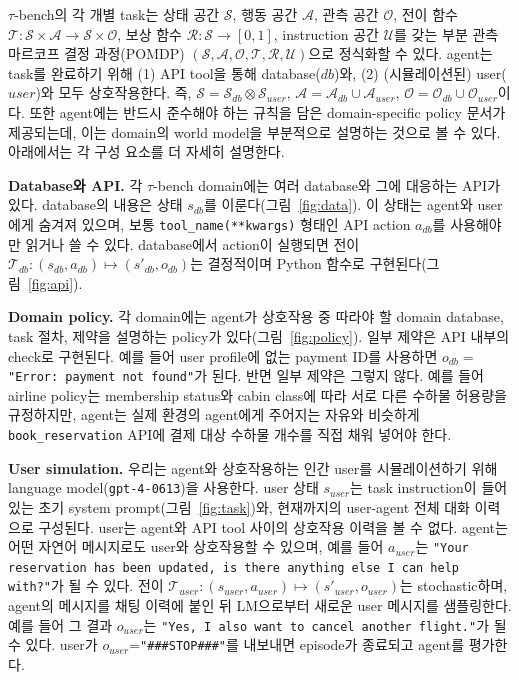 \documentclass{article}
\newcommand{\benchmark}{$\tau$-bench}
\begin{document}
 \benchmark{}의 각 개별 task는 상태 공간 $\mathcal{S}$, 행동 공간 $\mathcal{A}$, 관측 공간 $\mathcal{O}$, 전이 함수 $\mathcal{T}: \mathcal{S} \times \mathcal{A} \to \mathcal{S} \times \mathcal{O}$, 보상 함수 $\mathcal{R}: \mathcal{S} \to [0, 1]$, instruction 공간 $\mathcal{U}$를 갖는 부분 관측 마르코프 결정 과정(POMDP) $(\mathcal{S}, \mathcal{A}, \mathcal{O}, \mathcal{T}, \mathcal{R}, \mathcal{U})$으로 정식화할 수 있다. agent는 task를 완료하기 위해 (1) API tool을 통해 database($db$)와, (2) (시뮬레이션된) user($user$)와 모두 상호작용한다. 즉, $\mathcal{S}=\mathcal{S}_{db} \otimes \mathcal{S}_{user}$, $\mathcal{A} = \mathcal{A}_{db} \cup \mathcal{A}_{user}$, $\mathcal{O} = \mathcal{O}_{db} \cup \mathcal{O}_{user}$이다. 또한 agent에는 반드시 준수해야 하는 규칙을 담은 domain-specific policy 문서가 제공되는데, 이는 domain의 world model을 부분적으로 설명하는 것으로 볼 수 있다. 아래에서는 각 구성 요소를 더 자세히 설명한다.


\textbf{Database와 API.} 각 \benchmark{} domain에는 여러 database와 그에 대응하는 API가 있다. database의 내용은 상태 ${s}_{db}$를 이룬다(그림~\ref{fig:data}). 이 상태는 agent와 user에게 숨겨져 있으며, 보통 \texttt{tool\_name(**kwargs)} 형태인 API action ${a}_{db}$를 사용해야만 읽거나 쓸 수 있다. database에서 action이 실행되면 전이 $\mathcal{T}_{db}: (s_{db}, a_{db}) \mapsto (s'_{db}, o_{db})$는 결정적이며 Python 함수로 구현된다(그림~\ref{fig:api}).





\textbf{Domain policy.} 각 domain에는 agent가 상호작용 중 따라야 할 domain database, task 절차, 제약을 설명하는 policy가 있다(그림~\ref{fig:policy}). 일부 제약은 API 내부의 check로 구현된다. 예를 들어 user profile에 없는 payment ID를 사용하면 $o_{db}=$ \texttt{"Error: payment not found"}가 된다. 반면 일부 제약은 그렇지 않다. 예를 들어 airline policy는 membership status와 cabin class에 따라 서로 다른 수하물 허용량을 규정하지만, agent는 실제 환경의 agent에게 주어지는 자유와 비슷하게 \texttt{book\_reservation} API에 결제 대상 수하물 개수를 직접 채워 넣어야 한다.







\textbf{User simulation.} 우리는 agent와 상호작용하는 인간 user를 시뮬레이션하기 위해 language model(\texttt{gpt-4-0613})을 사용한다. user 상태 $s_{user}$는 task instruction이 들어 있는 초기 system prompt(그림~\ref{fig:task})와, 현재까지의 user-agent 전체 대화 이력으로 구성된다. user는 agent와 API tool 사이의 상호작용 이력을 볼 수 없다. agent는 어떤 자연어 메시지로도 user와 상호작용할 수 있으며, 예를 들어 $a_{user}$는 \texttt{"Your reservation has been updated,\,is there anything else I can help with?"}가 될 수 있다. 전이 $\mathcal{T}_{user}: (s_{user}, a_{user}) \mapsto (s'_{user}, o_{user})$는 stochastic하며, agent의 메시지를 채팅 이력에 붙인 뒤 LM으로부터 새로운 user 메시지를 샘플링한다. 예를 들어 그 결과 $o_{user}$는 \texttt{"Yes,\,I also want to cancel another flight."}가 될 수 있다. user가 $o_{user}$=\texttt{"\#\#\#STOP\#\#\#"}를 내보내면 episode가 종료되고 agent를 평가한다.
\end{document}
